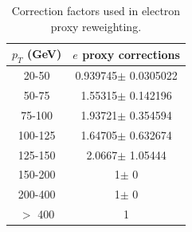 \begin{table}[htdp]
	\centering
  \begin{tabular}{|c|c|}
  \hline
  $p_T$ (GeV)  & $e$ proxy corrections \\ \hline
  20-50  & 0.939745$\pm$ 0.0305022  \\ \hline
  50-75  & 1.55315$\pm$ 0.142196  \\ \hline
  75-100  & 1.93721$\pm$ 0.354594  \\ \hline
  100-125  & 1.64705$\pm$ 0.632674  \\ \hline
  125-150  & 2.0667$\pm$ 1.05444  \\ \hline
  150-200  & 1$\pm$ 0  \\ \hline
  200-400  & 1$\pm$ 0  \\ \hline
  $>$ 400 & 1 \\ \hline
  \end{tabular}
  \caption{Correction factors used in electron proxy reweighting.}
  \label{table:correctionsfakelep}
\end{table}
